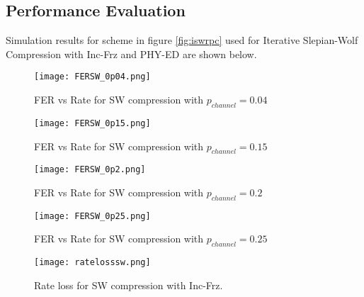 \documentclass[
11pt, %
a4paper, %
oneside, %
headinclude,footinclude, %
BCOR5mm, %
]{scrartcl}
\begin{document}
\subsection{Performance Evaluation}
Simulation results for scheme in figure \ref{fig:iswrpc} used for Iterative Slepian-Wolf Compression with Inc-Frz and PHY-ED are shown below.


\begin{figure}[h]
 \begin{center}
    \texttt{[image: FERSW\_0p04.png]}
  \end{center}
  \caption{FER vs Rate for SW compression with $p_{channel}=0.04$}
  \label{fig:fersw1}
\end{figure}
\begin{figure}[h]
 \begin{center}
    \texttt{[image: FERSW\_0p15.png]}
  \end{center}
  \caption{FER vs Rate for SW compression with $p_{channel}=0.15$ }
  \label{fig:fersw2}
\end{figure}
\begin{figure}[h]
 \begin{center}
    \texttt{[image: FERSW\_0p2.png]}
  \end{center}
  \caption{FER vs Rate for SW compression with $p_{channel}=0.2$ }
  \label{fig:fersw3}
\end{figure}
\begin{figure}[h]
 \begin{center}
    \texttt{[image: FERSW\_0p25.png]}
  \end{center}
  \caption{FER vs Rate for SW compression with $p_{channel}=0.25$ }
  \label{fig:fersw4}
\end{figure}
\begin{figure}[h]
 \begin{center}
    \texttt{[image: ratelosssw.png]}
  \end{center}
  \caption{Rate loss for SW compression with Inc-Frz.}
  \label{fig:rlsw}
\end{figure}
\clearpage
\end{document}
